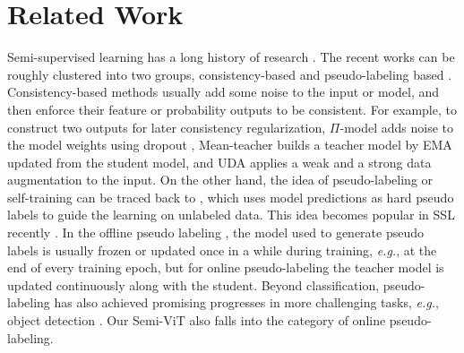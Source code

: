 \documentclass{article}
\newcommand\eg{\emph{e.g.}}
\begin{document}
\section{Related Work}

Semi-supervised learning has a long history of research \cite{zhu2005semi,chapelle2009semi}. The recent works can be roughly clustered into two groups, consistency-based \cite{DBLP:conf/iclr/LaineA17,DBLP:conf/nips/TarvainenV17,DBLP:journals/pami/MiyatoMKI19,DBLP:conf/nips/XieDHL020,DBLP:conf/ijcai/VermaLKBL19} and pseudo-labeling based \cite{lee2013pseudo,DBLP:conf/nips/SohnBCZZRCKL20,DBLP:conf/cvpr/PhamDXL21,DBLP:conf/cvpr/CaiRMFTS21}. Consistency-based methods usually add some noise to the input or model, and then enforce their feature or probability outputs to be consistent. For example, to construct two outputs for later consistency regularization, $\Pi$-model \cite{DBLP:conf/iclr/LaineA17} adds noise to the model weights using dropout \cite{DBLP:journals/jmlr/SrivastavaHKSS14}, Mean-teacher \cite{DBLP:conf/nips/TarvainenV17} builds a teacher model by EMA updated from the student model, and UDA \cite{DBLP:conf/nips/XieDHL020} applies a weak and a strong data augmentation to the input. On the other hand, the idea of pseudo-labeling or self-training can be traced back to \cite{DBLP:journals/tit/Scudder65a,mclachlan1975iterative}, which uses model predictions as hard pseudo labels to guide the learning on unlabeled data. This idea becomes popular in SSL recently \cite{lee2013pseudo,DBLP:conf/nips/SohnBCZZRCKL20,DBLP:conf/cvpr/PhamDXL21,DBLP:conf/cvpr/CaiRMFTS21,DBLP:conf/cvpr/XieLHL20}. In the offline pseudo labeling \cite{lee2013pseudo,DBLP:conf/cvpr/XieLHL20}, the model used to generate pseudo labels is usually frozen or updated once in a while during training, \eg, at the end of every training epoch, but for online pseudo-labeling \cite{DBLP:conf/nips/SohnBCZZRCKL20,DBLP:conf/cvpr/CaiRMFTS21} the teacher model is updated continuously along with the student. Beyond classification, pseudo-labeling has also achieved promising progresses in more challenging tasks, \eg, object detection \cite{sohn2020simple,DBLP:conf/iclr/LiuMHKCZWKV21,wang22omni}. Our Semi-ViT also falls into the category of online pseudo-labeling. 
\end{document}

